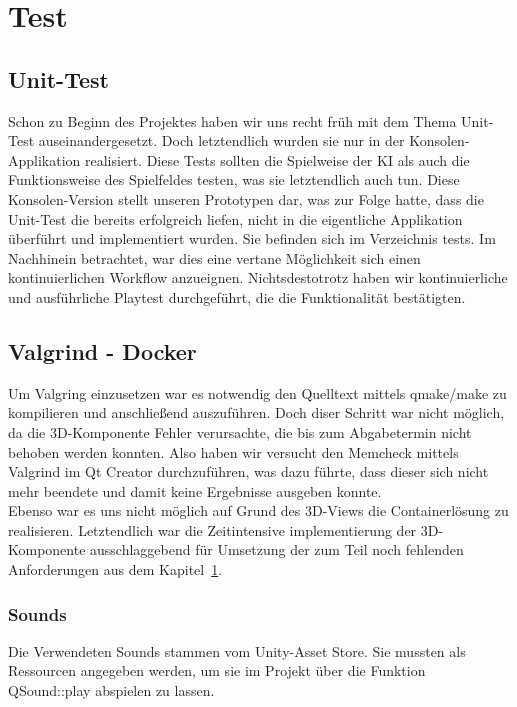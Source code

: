 \documentclass[a4paper]{scrartcl}
\begin{document}
\section{Test}\label{ch:Test}
\subsection{Unit-Test}\label{ch:Unit}
Schon zu Beginn des Projektes haben wir uns recht früh mit dem Thema Unit-Test auseinandergesetzt. Doch letztendlich wurden sie nur in der Konsolen-Applikation realisiert. Diese Tests sollten die Spielweise der KI als auch die 
Funktionsweise des Spielfeldes testen, was sie letztendlich auch tun. Diese Konsolen-Version stellt unseren Prototypen dar, was zur Folge hatte, dass die Unit-Test die bereits erfolgreich liefen, nicht in die eigentliche Applikation überführt und implementiert wurden. Sie befinden sich im Verzeichnis tests. Im Nachhinein betrachtet, war dies eine vertane Möglichkeit sich einen kontinuierlichen Workflow anzueignen. Nichtsdestotrotz haben wir kontinuierliche und ausführliche Playtest durchgeführt, die die Funktionalität bestätigten.

\subsection{Valgrind - Docker}\label{ch:Valgrind&Docker}
Um Valgring einzusetzen war es notwendig den Quelltext mittels qmake/make zu kompilieren und anschließend auszuführen. Doch diser Schritt war nicht möglich, da die 3D-Komponente Fehler verursachte, die bis zum Abgabetermin nicht behoben werden konnten. Also haben wir versucht den Memcheck mittels Valgrind im Qt Creator durchzuführen, was dazu führte, dass dieser sich nicht mehr beendete und damit keine Ergebnisse ausgeben konnte.
\\
Ebenso war es uns nicht möglich auf Grund des 3D-Views die Containerlösung zu realisieren. Letztendlich war die Zeitintensive implementierung der 3D-Komponente ausschlaggebend für Umsetzung der zum Teil noch fehlenden Anforderungen aus dem Kapitel~\ref{ch:Test}.

\subsubsection{Sounds}\label{ch:Sounds}
Die Verwendeten Sounds stammen vom Unity-Asset Store. Sie mussten als Ressourcen angegeben werden, um sie im Projekt über die Funktion QSound::play abspielen zu lassen.
\end{document}

